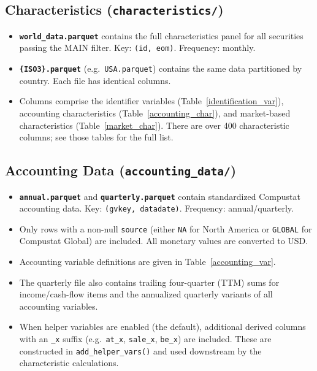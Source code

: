 \documentclass[12pt,title,fleqn]{article}
\begin{document}
\subsection{Characteristics (\texttt{characteristics/})}

\begin{itemize}
  \item \textbf{\texttt{world\_data.parquet}} contains the full characteristics panel for all securities passing the MAIN filter.  Key: \texttt{(id, eom)}.  Frequency: monthly.
  \item \textbf{\texttt{\{ISO3\}.parquet}} (e.g.\ \texttt{USA.parquet}) contains the same data partitioned by country.  Each file has identical columns.
  \item Columns comprise the identifier variables (Table~\ref{identification_var}), accounting characteristics (Table~\ref{accounting_char}), and market-based characteristics (Table~\ref{market_char}).  There are over 400 characteristic columns; see those tables for the full list.
\end{itemize}

\subsection{Accounting Data (\texttt{accounting\_data/})}

\begin{itemize}
  \item \textbf{\texttt{annual.parquet}} and \textbf{\texttt{quarterly.parquet}} contain standardized Compustat accounting data.  Key: \texttt{(gvkey, datadate)}.  Frequency: annual/quarterly.
  \item Only rows with a non-null \texttt{source} (either \texttt{NA} for North America or \texttt{GLOBAL} for Compustat Global) are included.  All monetary values are converted to USD.
  \item Accounting variable definitions are given in Table~\ref{accounting_var}.
  \item The quarterly file also contains trailing four-quarter (TTM) sums for income/cash-flow items and the annualized quarterly variants of all accounting variables.
  \item When helper variables are enabled (the default), additional derived columns with an \texttt{\_x} suffix (e.g.\ \texttt{at\_x}, \texttt{sale\_x}, \texttt{be\_x}) are included.  These are constructed in \texttt{add\_helper\_vars()} and used downstream by the characteristic calculations.
\end{itemize}
\end{document}
